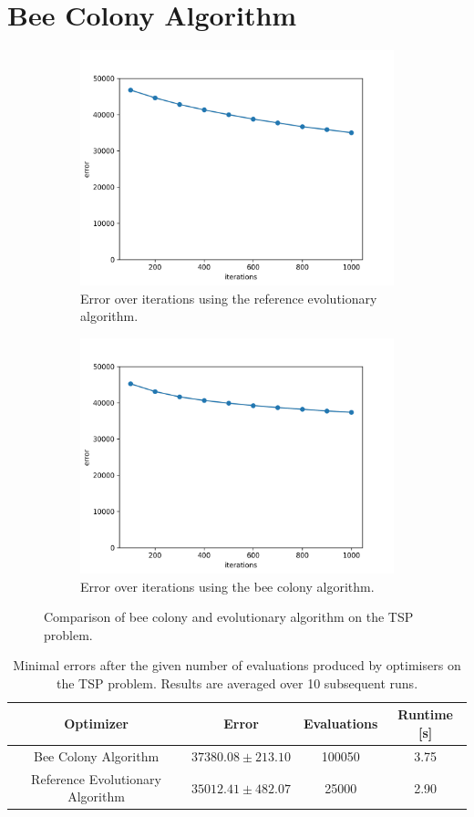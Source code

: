 \section{Bee Colony Algorithm}

\begin{figure}[h]
	\centering
	\begin{subfigure}{.5\textwidth}
		\centering
		\includegraphics[width=0.75\linewidth]{assets/reference_tsp.png}
		\caption{Error over iterations using the reference evolutionary algorithm.}
		\label{fig:reference_tsp}
	\end{subfigure}%
	\begin{subfigure}{.5\textwidth}
		\includegraphics[width=0.75\linewidth]{assets/beecolony_tsp.png}
		\caption{Error over iterations using the bee colony algorithm.}
		\label{fig:becolony_tsp}
	\end{subfigure}
	\caption{Comparison of bee colony and evolutionary algorithm on the TSP problem.}
	\label{fig:bee_vs_ea}
\end{figure}

\begin{table}[H]
	\centering
	\begin{tabular}{|c c c c|}
		\hline
		\textbf{Optimizer} & \textbf{Error} & \textbf{Evaluations} & \textbf{Runtime [s]} \\
		\hline
		Bee Colony Algorithm & $37380.08 \pm 213.10$ & 100050 & 3.75 \\
		Reference Evolutionary Algorithm & $35012.41 \pm 482.07$ & 25000 & 2.90 \\
		\hline
	\end{tabular}
	\caption{Minimal errors after the given number of evaluations produced by optimisers on the TSP problem. Results are averaged over 10 subsequent runs.}
	\label{tab:bee_vs_ea}
\end{table}